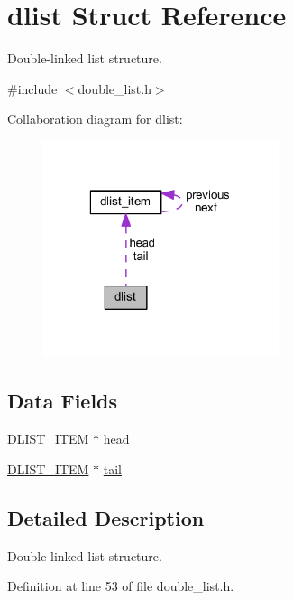 \hypertarget{structdlist}{}\section{dlist Struct Reference}
\label{structdlist}


Double-\/linked list structure.  




{\ttfamily \#include $<$double\+\_\+list.\+h$>$}



Collaboration diagram for dlist\+:
\nopagebreak
\begin{figure}[H]
\begin{center}
\leavevmode
\includegraphics[width=196pt]{structdlist__coll__graph}
\end{center}
\end{figure}
\subsection*{Data Fields}
\begin{DoxyCompactItemize}
\item 
\hyperlink{double__list_8h_ad2863d2b4efe59432e1868606a5b74b6}{D\+L\+I\+S\+T\+\_\+\+I\+T\+EM} $\ast$ \hyperlink{structdlist_a8b41eb6a98fac7979652003285f65313}{head}
\item 
\hyperlink{double__list_8h_ad2863d2b4efe59432e1868606a5b74b6}{D\+L\+I\+S\+T\+\_\+\+I\+T\+EM} $\ast$ \hyperlink{structdlist_af47038909dd24dd5205cbb96509a48bf}{tail}
\end{DoxyCompactItemize}


\subsection{Detailed Description}
Double-\/linked list structure. 

Definition at line 53 of file double\+\_\+list.\+h.



